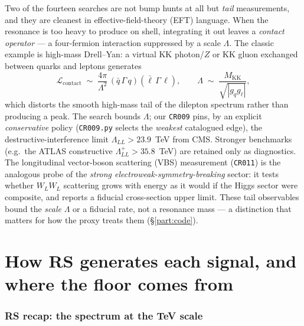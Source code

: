\documentclass[11pt]{article}
\newcommand{\MKK}{M_{\mathrm{KK}}}
\newcommand{\code}[1]{\texttt{#1}}
\theoremstyle{definition}
\begin{document}
Two of the fourteen searches are not bump hunts at all but \emph{tail}
measurements, and they are cleanest in effective-field-theory (EFT) language.
When the resonance is too heavy to produce on shell, integrating it out leaves a
\emph{contact operator} --- a four-fermion interaction suppressed by a scale
$\Lambda$. The classic example is high-mass Drell--Yan: a virtual KK photon/$Z$
or KK gluon exchanged between quarks and leptons generates
\begin{equation}
\mathcal{L}_{\mathrm{contact}} \;\sim\; \frac{4\pi}{\Lambda^2}\,
(\bar q\,\Gamma\, q)(\bar\ell\,\Gamma\,\ell),
\qquad
\Lambda \;\sim\; \frac{\MKK}{\sqrt{|g_q g_\ell|}},
\label{eq:contact}
\end{equation}
which distorts the smooth high-mass tail of the dilepton spectrum rather than
producing a peak. The search bounds $\Lambda$; our \code{CR009} pins, by an
explicit \emph{conservative} policy (\code{CR009.py} selects the
\emph{weakest} catalogued edge), the destructive-interference limit
$\Lambda_{LL} > 23.9$~TeV from CMS. Stronger benchmarks (e.g.\ the ATLAS
constructive $\Lambda_{LL}^{+} > 35.8$~TeV) are retained only as diagnostics. The longitudinal vector-boson
scattering (VBS) measurement (\code{CR011}) is the analogous probe of the
\emph{strong electroweak-symmetry-breaking} sector: it tests whether $W_L W_L$
scattering grows with energy as it would if the Higgs sector were composite, and
reports a fiducial cross-section upper limit. These tail observables bound the
\emph{scale} $\Lambda$ or a fiducial rate, not a resonance mass --- a distinction
that matters for how the proxy treats them (\S\ref{part:code}).

\part{How RS generates each signal, and where the floor comes from}
\label{part:rs}

\section{RS recap: the spectrum at the TeV scale}
\label{sec:rsrecap}
\end{document}
